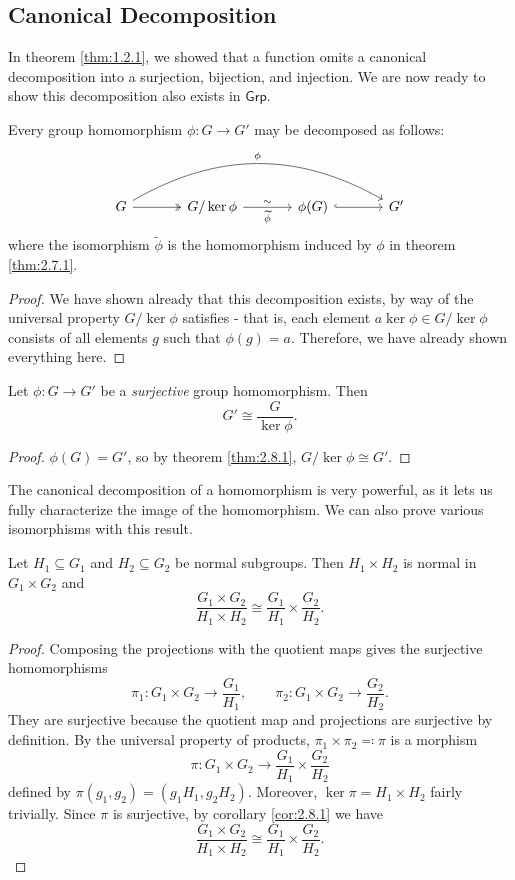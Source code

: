 \subsection{Canonical Decomposition}
In theorem \ref{thm:1.2.1}, we showed that a function omits a canonical decomposition into a surjection, bijection, and injection. We are now ready to show this decomposition also exists in $\mathsf{Grp}$.
\begin{theorem}\label{thm:2.8.1}
	Every group homomorphism $\phi : G \to G'$ may be decomposed as follows:
	\[\begin{tikzcd}[row sep=1em, column sep=3.5em]
		G\arrow[rrr, bend left, "\phi "]\arrow[r, two heads]&G /\ker \phi \arrow[r, "\sim ", "\widetilde{\phi}"']& \phi(G)\arrow[r, hook] & G'
	\end{tikzcd}\]
	where the isomorphism $\widetilde{\phi} $ is the homomorphism induced by $\phi $ in theorem \ref{thm:2.7.1}.
\end{theorem}
\begin{proof}
	We have shown already that this decomposition exists, by way of the universal property $G /\ker \phi $ satisfies - that is, each element $a\ker \phi \in G /\ker \phi $ consists of all elements $g$ such that $\phi (g)=a$. Therefore, we have already shown everything here.
\end{proof}
\begin{corollary}\label{cor:2.8.1}
	Let $\phi : G \to G'$ be a \emph{surjective} group homomorphism. Then
	\[
		G' \cong \frac{G}{\ker \phi }
	.\]
\end{corollary}
\begin{proof}
	$\phi (G)=G'$, so by theorem \ref{thm:2.8.1}, $G /\ker \phi \cong G'$.
\end{proof}
The canonical decomposition of a homomorphism is very powerful, as it lets us fully characterize the image of the homomorphism. We can also prove various isomorphisms with this result.
\begin{proposition}\label{prp:2.8.1}
	Let $H_1\subseteq G_1$ and $H_2\subseteq G_2$ be normal subgroups. Then $H_1\times H_2$ is normal in $G_1\times G_2$ and
	\[
		\frac{G_1\times G_2}{H_1\times H_2}\cong \frac{G_1}{H_1}\times \frac{G_2}{H_2}
	.\]
\end{proposition}
\begin{proof}
	Composing the projections with the quotient maps gives the surjective homomorphisms
	\[
		\pi_1 :G_1\times G_2 \to \frac{G_1}{H_1},\qquad \pi_2: G_1\times G_2 \to \frac{G_2}{H_2}
	.\]
	They are surjective because the quotient map and projections are surjective by definition. By the universal property of products, $\pi_1\times \pi_2 \eqqcolon \pi $ is a morphism
	\[
		\pi : G_1\times G_2 \to \frac{G_1}{H_1}\times \frac{G_2}{H_2}
	\]
	defined by $\pi (g_1,g_2)=(g_1H_1,g_2H_2)$. Moreover, $\ker \pi =H_1\times H_2$ fairly trivially. Since $\pi $ is surjective, by corollary \ref{cor:2.8.1} we have
	\[
		\frac{G_1\times G_2}{H_1\times H_2}\cong \frac{G_1}{H_1}\times \frac{G_2}{H_2}
	.\]
\end{proof}

